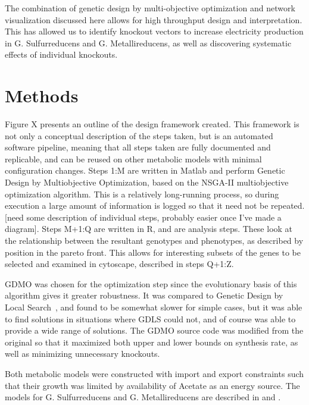 \documentclass[a4paper,twocolumn]{article}
\begin{document}
The combination of genetic design by multi-objective optimization and network visualization discussed here allows for high throughput design and interpretation. This has allowed us to identify knockout vectors to increase electricity production in G. Sulfurreducens and G. Metallireducens, as well as discovering systematic effects of individual knockouts.

\section{Methods}

Figure X presents an outline of the design framework created. This framework is not only a conceptual description of the steps taken, but is an automated software pipeline, meaning that all steps taken are fully documented and replicable, and can be reused on other metabolic models with minimal configuration changes. Steps 1:M are written in Matlab and perform Genetic Design by Multiobjective Optimization, based on the NSGA-II multiobjective optimization algorithm. This is a relatively long-running process, so during execution a large amount of information is logged so that it need not be repeated. [need some description of individual steps, probably easier once I’ve made a diagram]. Steps M+1:Q are written in R, and are analysis steps. These look at the relationship between the resultant genotypes and phenotypes, as described by position in the pareto front. This allows for interesting subsets of the genes to be selected and examined in cytoscape, described in steps Q+1:Z.

GDMO was chosen for the optimization step since the evolutionary basis of this algorithm gives it greater robustness. It was compared to Genetic Design by Local Search~\cite{}, and found to be somewhat slower for simple cases, but it was able to find solutions in situations where GDLS could not, and of course was able to provide a wide range of solutions. The GDMO source code was modified from the original so that it maximized both upper and lower bounds on synthesis rate, as well as minimizing unnecessary knockouts.

Both metabolic models were constructed with import and export constraints such that their growth was limited by availability of Acetate as an energy source. The models for G. Sulfurreducens and G. Metallireducens are described in \cite{} and \cite{}.
\end{document}
